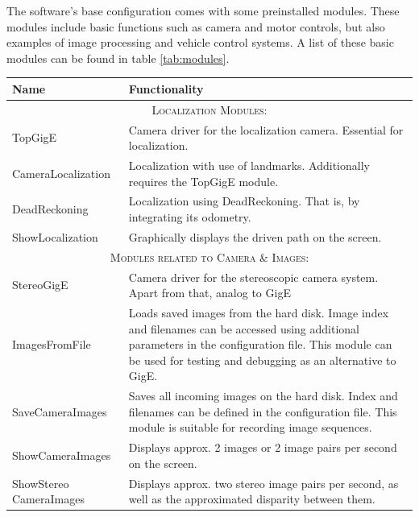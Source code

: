 \documentclass[a4paper, 11pt]{article}
\begin{document}
The software's base configuration comes with some preinstalled modules. These modules include basic functions such as camera and motor controls, but also examples of image processing and vehicle control systems. A list of these basic modules can be found in table \ref{tab:modules}.

\begin{table}
\centering
\begin{tabular}{p{}p{}}
\hline
Name & Functionality \\
\hline\hline
\multicolumn{2}{|c|}{\textsc{Localization Modules:}} \\
\hline
TopGigE & \raggedright Camera driver for the localization camera. Essential for localization. \tabularnewline
CameraLocalization & \raggedright Localization with use of landmarks. Additionally requires the TopGigE module. \tabularnewline
DeadReckoning & \raggedright Localization using DeadReckoning. That is, by integrating its odometry. \tabularnewline
ShowLocalization & \raggedright Graphically displays the driven path on the screen. \tabularnewline
\hline
\multicolumn{2}{|c|}{\textsc{Modules related to Camera \& Images:}} \\
\hline
StereoGigE & \raggedright Camera driver for the stereoscopic camera system. Apart from that, analog to GigE \tabularnewline
ImagesFromFile & \raggedright Loads saved images from the hard disk. Image index and filenames can be accessed using additional parameters in the configuration file. This module can be used for testing and debugging as an alternative to GigE.  \tabularnewline
SaveCameraImages & \raggedright Saves all incoming images on the hard disk. Index and filenames can be defined in the configuration file. This module is suitable for recording image sequences. \tabularnewline
ShowCameraImages & \raggedright Displays approx. 2 images or 2 image pairs per second on the screen.\tabularnewline
ShowStereo \hspace*{2em}\mbox{CameraImages} & \raggedright Displays approx. two stereo image pairs per second, as well as the approximated disparity between them. \tabularnewline

\end{tabular}
\end{table}
\end{document}
